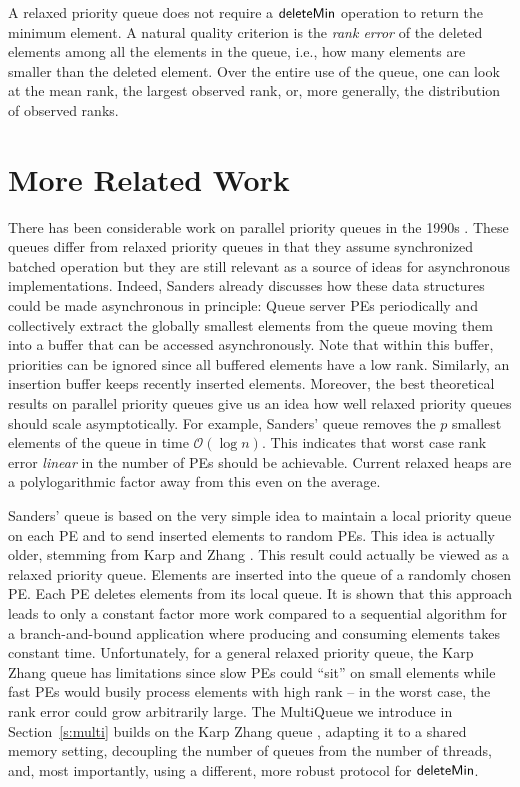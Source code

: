 \documentclass[a4paper,12pt]{article}
\newcommand{\Id}[1]{\ensuremath{\text{{\sf #1}}}}
\newcommand{\Oh}[1]{\mathcal{O}\!\left( #1\right)}
\begin{document}
A relaxed priority queue does not require a \Id{deleteMin} operation to return the minimum element. A natural quality criterion is the \emph{rank error} of the deleted elements among all the elements in the queue, i.e., how many elements are smaller than the deleted element. Over the entire use of the queue, one can look at the mean rank, the largest observed rank, or, more generally, the distribution of observed ranks.

\section{More Related Work}
\label{s:related}

There has been considerable work on parallel priority queues in the 1990s \cite{DeoPra92,RanEtAl94,San98a}. 
These queues differ from relaxed priority queues in that they assume synchronized batched operation but they are still relevant as a source of ideas for asynchronous implementations. Indeed, Sanders \cite{San98a} already discusses how these data structures could be made asynchronous in principle: Queue server PEs periodically and collectively extract the globally smallest elements from the queue moving them into a buffer that can be accessed asynchronously. Note that within this buffer, priorities can be ignored since all buffered elements have a low rank. Similarly, an insertion buffer keeps recently inserted elements.
Moreover, the best theoretical  results on parallel priority queues give us an idea how well relaxed priority queues should scale asymptotically. For example, Sanders' queue \cite{San98a} removes the $p$ smallest elements of the queue in time $\Oh{\log n}$. This indicates that worst case rank error \emph{linear} in the number of PEs should be achievable. Current relaxed heaps are a polylogarithmic factor away from this even on the average.

Sanders' queue \cite{San98a} is based on the very simple idea to maintain a local priority queue on each PE and to send inserted elements to random PEs. This idea is actually older, stemming from Karp and Zhang \cite{KarZha93}.
This result could actually be viewed as a relaxed priority queue. Elements are inserted into the queue of a randomly chosen PE. Each PE deletes elements from its local queue. It is shown that this approach leads to only a constant factor more work compared to a sequential algorithm for a branch-and-bound application 
where producing and consuming elements takes constant time. Unfortunately, for a general relaxed priority queue, the Karp Zhang queue \cite{KarZha93} has limitations since slow PEs could ``sit'' on small elements while fast PEs would busily process elements with high rank -- in the worst case, the rank error could grow arbitrarily large.
The MultiQueue we introduce in Section~\ref{s:multi} builds on the Karp Zhang queue \cite{KarZha93}, adapting it to a shared memory setting, decoupling the number of queues from the number of threads, and, most importantly, using a different, more robust protocol for \Id{deleteMin}.
\end{document}
